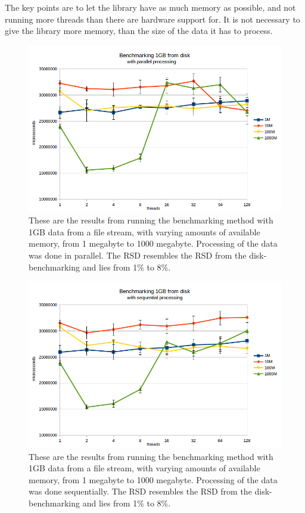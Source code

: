 \documentclass[a4paper]{article}
\begin{document}
The key points are to let the library have as much memory as possible, and not running more threads than there are hardware support for. It is not necessary to give the library more memory, than the size of the data it has to process.

\begin{figure}
	\begin{adjustwidth}{-0.5in}{-0.5in}
    \centering
     \includegraphics[scale=0.7]{figures/disk_par.png}
  	\caption{These are the results from running the benchmarking method with 1GB data from a file stream, with varying amounts of available memory, from 1 megabyte to 1000 megabyte. Processing of the data was done in parallel. The RSD resembles the RSD from the disk-benchmarking and lies from 1\% to 8\%.}
	\label{figure:disk-par}
	\end{adjustwidth}
\end{figure}

\begin{figure}
	\begin{adjustwidth}{-0.5in}{-0.5in}
    \centering
     \includegraphics[scale=0.7]{figures/disk_seq.png}
  	\caption{These are the results from running the benchmarking method with 1GB data from a file stream, with varying amounts of available memory, from 1 megabyte to 1000 megabyte. Processing of the data was done sequentially. The RSD resembles the RSD from the disk-benchmarking and lies from 1\% to 8\%.}
	\label{figure:disk-seq}
	\end{adjustwidth}
\end{figure}
\end{document}
